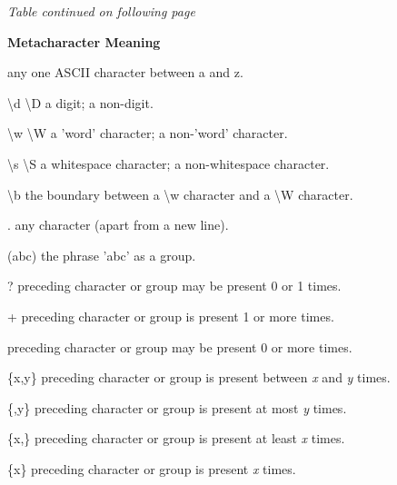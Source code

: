 \documentclass[a4paper,11pt]{book}
\begin{document}
\noindent \textit{Table continued on following page}

\noindent 

\noindent 

\noindent 

\noindent \textbf{Metacharacter Meaning}

\noindent 

\noindent [a-z] any one ASCII character between a and z.

\noindent 

\noindent \textbackslash d \textbackslash D a digit; a non-digit.

\noindent 

\noindent \textbackslash w \textbackslash W a 'word' character; a non-'word' character.

\noindent 

\noindent \textbackslash s \textbackslash S a whitespace character; a non-whitespace character.

\noindent 

\noindent \textbackslash b the boundary between a \textbackslash w character and a \textbackslash W character.

\noindent 

\noindent . any character (apart from a new line).

\noindent 

\noindent (abc) the phrase 'abc' as a group.

\noindent 

\noindent ? preceding character or group may be present 0 or 1 times.

\noindent 

\noindent + preceding character or group is present 1 or more times.

\noindent 

\noindent * preceding character or group may be present 0 or more times.

\noindent 

\noindent \{x,y\} preceding character or group is present between \textit{x }and \textit{y }times.

\noindent 

\noindent \{,y\} preceding character or group is present at most \textit{y }times.

\noindent 

\noindent \{x,\} preceding character or group is present at least \textit{x }times.

\noindent 

\noindent \{x\} preceding character or group is present \textit{x }times.
\end{document}
